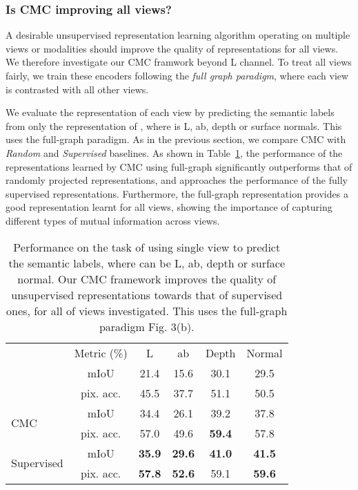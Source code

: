 \documentclass[10pt,twocolumn,letterpaper]{article}
\begin{document}
\subsubsection{Is CMC improving all views?}

A desirable unsupervised representation learning algorithm operating on multiple views or modalities should improve the quality of representations for all views. We therefore investigate our CMC framwork beyond L channel. To treat all views fairly, we train these encoders following the \emph{full graph paradigm}, where each view is contrasted with all other views.

We evaluate the representation of each view  by predicting the semantic labels from only the representation of , where  is L, ab, depth or surface normals. This uses the full-graph paradigm.
As in the previous section, we compare CMC with \emph{Random} and \emph{Supervised} baselines. As shown in Table~\ref{tbl:nyu_all}, the performance of the representations learned by CMC using full-graph significantly outperforms that of randomly projected representations, and approaches the performance of the fully supervised representations. Furthermore, the full-graph representation provides a good representation learnt for all views, showing the importance of capturing different types of mutual information across views.

\begin{table}[t]
    \setlength{\tabcolsep}{4.5pt}
	\centering
    \begin{tabular}{l|c|cccc}
     & Metric (\%) & L & ab & Depth & Normal \\
    \shline
    \multirow{2}{*}{Random}      & mIoU & 21.4 & 15.6 & 30.1 & 29.5 \\
                             & pix. acc.& 45.5 & 37.7 & 51.1 & 50.5 \\
    \hline
    \multirow{2}{*}{CMC}         & mIoU & 34.4 & 26.1 & 39.2 & 37.8 \\
                             & pix. acc.& 57.0 & 49.6 & \textbf{59.4} & 57.8 \\
    \hline
    \multirow{2}{*}{Supervised}  & mIoU & \textbf{35.9} & \textbf{29.6} & \textbf{41.0} & \textbf{41.5} \\
                             & pix. acc.& \textbf{57.8} & \textbf{52.6} & 59.1 & \textbf{59.6} \\
    \end{tabular}
    \caption{\small{Performance on the task of using single view  to predict the semantic labels, where  can be L, ab, depth or surface normal. Our CMC framework improves the quality of unsupervised representations towards that of supervised ones, for all of views investigated. This uses the full-graph paradigm Fig. 3(b).}}
    \label{tbl:nyu_all}
\end{table} 
\end{document}
